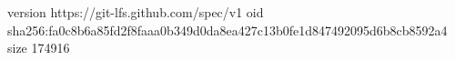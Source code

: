 version https://git-lfs.github.com/spec/v1
oid sha256:fa0c8b6a85fd2f8faaa0b349d0da8ea427c13b0fe1d847492095d6b8cb8592a4
size 174916
